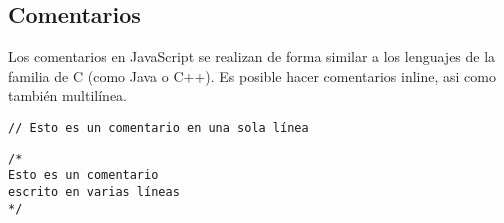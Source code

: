 \subsection{Comentarios}

Los comentarios en JavaScript se realizan de forma similar a los lenguajes de la familia de C (como Java o C++). Es posible hacer comentarios inline, asi como también multilínea.

\begin{lstlisting}[title={Comentario inline}]
// Esto es un comentario en una sola línea
\end{lstlisting}

\begin{lstlisting}[title={Comentario multilínea}]
/* 
Esto es un comentario
escrito en varias líneas
*/
\end{lstlisting}